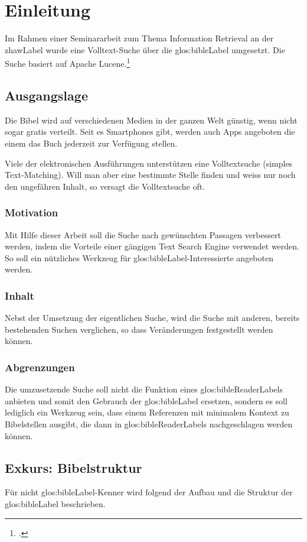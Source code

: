 \chapter{Einleitung}
Im Rahmen einer Seminararbeit zum Thema Information Retrieval an der \gls{zhawLabel} wurde eine Volltext-Suche über die \gls{glos:bibleLabel} umgesetzt. Die Suche basiert auf Apache Lucene.\footcite{Apache_Lucene_2016-05-07}

\section{Ausgangslage}
Die Bibel wird auf verschiedenen Medien in der ganzen Welt günstig, wenn nicht sogar gratis verteilt.
Seit es Smartphones gibt, werden auch Apps angeboten die einem das Buch jederzeit zur Verfügung stellen.

Viele der elektronischen Ausführungen unterstützen eine Volltextsuche (simples Text-Matching).
Will man aber eine bestimmte Stelle finden und weiss nur noch den ungefähren Inhalt, so versagt die Volltextsuche oft.

\subsection{Motivation}
Mit Hilfe dieser Arbeit soll die Suche nach gewünschten Passagen verbessert werden, indem die Vorteile einer gängigen Text Search Engine verwendet werden.
So soll ein nützliches Werkzeug für \gls{glos:bibleLabel}-Interessierte angeboten werden.

\subsection{Inhalt}
Nebst der Umsetzung der eigentlichen Suche, wird die Suche mit anderen, bereits bestehenden Suchen verglichen, so dass Veränderungen festgestellt werden können.

\subsection{Abgrenzungen}
Die umzusetzende Suche soll nicht die Funktion eines \gls{glos:bibleReaderLabel}s anbieten und somit den Gebrauch der \gls{glos:bibleLabel} ersetzen, sondern es soll lediglich ein Werkzeug sein, dass einem Referenzen mit minimalem Kontext zu Bibelstellen ausgibt, die dann in \glspl{glos:bibleReaderLabel} nachgeschlagen werden können.

\section{Exkurs: Bibelstruktur}
Für nicht \gls{glos:bibleLabel}-Kenner wird folgend der Aufbau und die Struktur der \gls{glos:bibleLabel} beschrieben.


